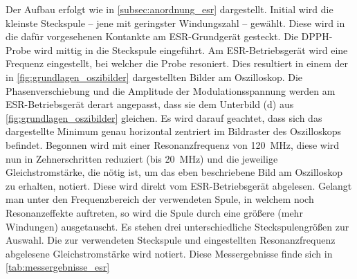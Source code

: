\documentclass[ngerman]{scrartcl}
\begin{document}
Der Aufbau erfolgt wie in \autoref{subsec:anordnung_esr} dargestellt. Initial wird die kleinste Steckspule -- jene mit geringster Windungszahl -- gewählt. Diese wird in die dafür vorgesehenen Kontankte am ESR-Grundgerät gesteckt. Die DPPH-Probe wird mittig in die Steckspule eingeführt. Am ESR-Betriebsgerät wird eine Frequenz eingestellt, bei welcher die Probe resoniert. Dies resultiert in einem der in \autoref{fig:grundlagen_oszibilder} dargestellten Bilder am Oszilloskop. Die Phasenverschiebung und die Amplitude der Modulationsspannung werden am ESR-Betriebsgerät derart angepasst, dass sie dem Unterbild (d) aus \autoref{fig:grundlagen_oszibilder} gleichen. Es wird darauf geachtet, dass sich das dargestellte Minimum genau horizontal zentriert im Bildraster des Oszilloskops befindet. Begonnen wird mit einer Resonanzfrequenz von \SI{120}{MHz}, diese wird nun in Zehnerschritten reduziert (bis \SI{20}{MHz}) und die jeweilige Gleichstromstärke, die nötig ist, um das eben beschriebene Bild am Oszilloskop zu erhalten, notiert. Diese wird direkt vom ESR-Betriebsgerät abgelesen. Gelangt man unter den Frequenzbereich der verwendeten Spule, in welchem noch Resonanzeffekte auftreten, so wird die Spule durch eine größere (mehr Windungen) ausgetauscht. Es stehen drei unterschiedliche Steckspulengrößen zur Auswahl. Die zur verwendeten Steckspule und eingestellten Resonanzfrequenz abgelesene Gleichstromstärke wird notiert. Diese Messergebnisse finde sich in \autoref{tab:messergebnisse_esr}
%
\end{document}
